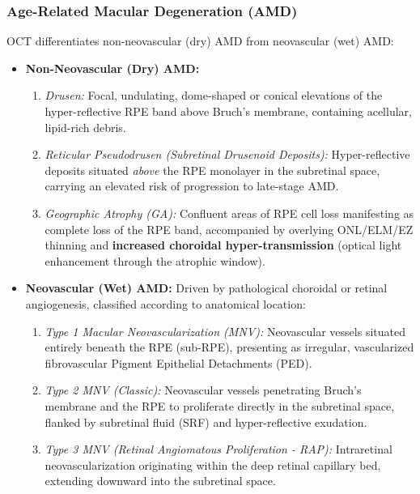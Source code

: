 \documentclass[11pt,a4paper]{article}
\begin{document}
\subsubsection{Age-Related Macular Degeneration (AMD)}
OCT differentiates non-neovascular (dry) AMD from neovascular (wet) AMD:
\begin{itemize}[leftmargin=*]
    \item \textbf{Non-Neovascular (Dry) AMD:}
    \begin{enumerate}
        \item \textit{Drusen:} Focal, undulating, dome-shaped or conical elevations of the hyper-reflective RPE band above Bruch's membrane, containing acellular, lipid-rich debris.
        \item \textit{Reticular Pseudodrusen (Subretinal Drusenoid Deposits):} Hyper-reflective deposits situated \textit{above} the RPE monolayer in the subretinal space, carrying an elevated risk of progression to late-stage AMD.
        \item \textit{Geographic Atrophy (GA):} Confluent areas of RPE cell loss manifesting as complete loss of the RPE band, accompanied by overlying ONL/ELM/EZ thinning and \textbf{increased choroidal hyper-transmission} (optical light enhancement through the atrophic window).
    \end{enumerate}
    \item \textbf{Neovascular (Wet) AMD:} Driven by pathological choroidal or retinal angiogenesis, classified according to anatomical location:
    \begin{enumerate}
        \item \textit{Type 1 Macular Neovascularization (MNV):} Neovascular vessels situated entirely beneath the RPE (sub-RPE), presenting as irregular, vascularized fibrovascular Pigment Epithelial Detachments (PED).
        \item \textit{Type 2 MNV (Classic):} Neovascular vessels penetrating Bruch's membrane and the RPE to proliferate directly in the subretinal space, flanked by subretinal fluid (SRF) and hyper-reflective exudation.
        \item \textit{Type 3 MNV (Retinal Angiomatous Proliferation - RAP):} Intraretinal neovascularization originating within the deep retinal capillary bed, extending downward into the subretinal space.
    \end{enumerate}
\end{itemize}
\end{document}
